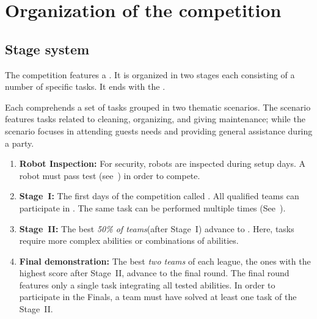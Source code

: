 \section{Organization of the competition}
\label{sec:procedure_during_competition}

\subsection{Stage system}\label{rule:stages}

The competition features a . It is organized in two stages each consisting of a number of specific tasks. It ends with the .

Each  comprehends a set of tasks grouped in two thematic scenarios.
The  scenario features tasks related to cleaning, organizing, and giving maintenance; while the  scenario focuses in attending guests needs and providing general assistance during a party.

\begin{enumerate}
	\item \textbf{Robot Inspection:} For security, robots are inspected during setup days. A robot must pass  test (see~) in order to compete.

	\item \textbf{Stage~I:} The first days of the competition called .
	All qualified teams can participate in .
	The same task can be performed multiple times (See~).

	\item \textbf{Stage~II:} The best \emph{50\% of teams}\footnotemark (after Stage~I) advance to .
	Here, tasks require more complex abilities or combinations of abilities.\\

	\item \textbf{Final demonstration:} The best \emph{two teams} of each league, the ones with the highest score after Stage~II, advance to the final round.
	The final round features only a single task integrating all tested abilities.
	In order to participate in the Finals, a team must have solved at least one task of the Stage~II.
\end{enumerate}

